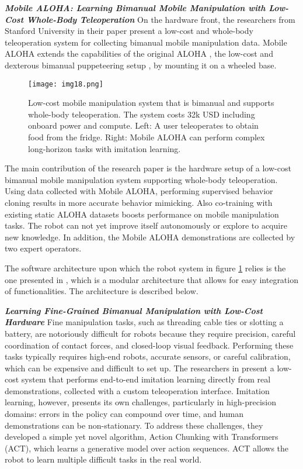\textbf{\textit{Mobile ALOHA: Learning Bimanual Mobile Manipulation with
		Low-Cost Whole-Body Teleoperation}} \quad
On the hardware front, the researchers from Stanford University in their paper \cite{tony2024mobile}
present a low-cost and whole-body teleoperation system for collecting bimanual mobile manipulation
data. Mobile ALOHA extends the capabilities of the original ALOHA \cite{tony2023bimanual},
the low-cost and dexterous bimanual puppeteering setup \cite{tony2023bimanual},
by mounting it on a wheeled base.

\begin{figure}[t]
	\centering
	\texttt{[image: img18.png]}
	\captionsetup{width=1\linewidth}
	\caption{Low-cost mobile manipulation system that is bimanual and supports whole-body teleoperation.
		The system costs 32k USD including onboard power and compute. Left: A user teleoperates to
		obtain food from the fridge. Right: Mobile ALOHA can perform complex long-horizon tasks
		with imitation learning. \cite{tony2024mobile}}
	\label{fig:img18}
\end{figure}

The main contribution of the research paper \cite{tony2024mobile} is the hardware setup of
a low-cost bimanual mobile manipulation system supporting whole-body teleoperation.
Using data collected with Mobile ALOHA, performing supervised behavior cloning results in more
accurate behavior mimicking. Also co-training with existing static ALOHA datasets \cite{tony2023bimanual}
boosts performance on mobile manipulation tasks.
The robot can not yet improve itself autonomously or explore to acquire new knowledge.
In addition, the Mobile ALOHA demonstrations are collected by two expert operators.

The software architecture upon which the robot system in figure \ref{fig:img18} relies
is the one presented in \cite{tony2023bimanual}, which is a modular architecture
that allows for easy integration of functionalities. The architecture is described below.

\textbf{\textit{Learning Fine-Grained Bimanual Manipulation with
		Low-Cost Hardware}} \quad
Fine manipulation tasks, such as threading cable ties or slotting a battery, are notoriously difficult
for robots because they require precision, careful coordination of contact forces, and closed-loop
visual feedback. Performing these tasks typically requires high-end robots, accurate sensors,
or careful calibration, which can be expensive and difficult to set up.
The researchers in \cite{tony2023bimanual} present a low-cost system that performs
end-to-end imitation learning directly from real demonstrations, collected with a custom
teleoperation interface. Imitation learning, however, presents its own challenges,
particularly in high-precision domains: errors in the policy can compound over time,
and human demonstrations can be non-stationary. To address these challenges, they developed a simple yet
novel algorithm, Action Chunking with Transformers (ACT), which learns a generative
model over action sequences. ACT allows the robot to learn multiple difficult tasks in the real world.


